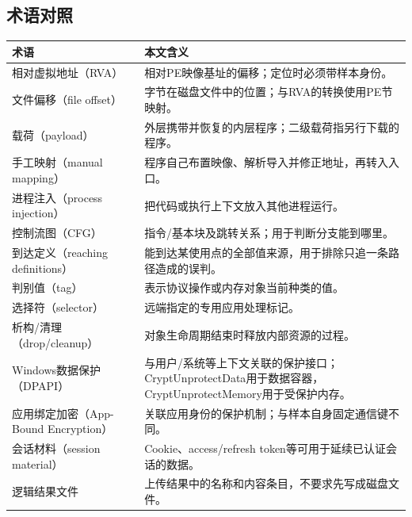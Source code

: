 \documentclass[UTF8,a4paper,zihao=5,fontset=windows]{ctexart}
\newcommand{\code}[1]{{\ttfamily\small #1}}
\begin{document}
\subsection{术语对照}
\begin{longtable}{@{}L{43mm}L{107mm}@{}}\toprule 术语 & 本文含义\\\midrule\endhead
相对虚拟地址（RVA） & 相对PE映像基址的偏移；定位时必须带样本身份。\\
文件偏移（file offset） & 字节在磁盘文件中的位置；与RVA的转换使用PE节映射。\\
载荷（payload） & 外层携带并恢复的内层程序；二级载荷指另行下载的程序。\\
手工映射（manual mapping） & 程序自己布置映像、解析导入并修正地址，再转入入口。\\
进程注入（process injection） & 把代码或执行上下文放入其他进程运行。\\
控制流图（CFG） & 指令/基本块及跳转关系；用于判断分支能到哪里。\\
到达定义（reaching definitions） & 能到达某使用点的全部值来源，用于排除只追一条路径造成的误判。\\
判别值（tag） & 表示协议操作或内存对象当前种类的值。\\
选择符（selector） & 远端指定的专用应用处理标记。\\
析构/清理（drop/cleanup） & 对象生命周期结束时释放内部资源的过程。\\
Windows数据保护（DPAPI） & 与用户/系统等上下文关联的保护接口；\code{CryptUnprotectData}用于数据容器，\code{CryptUnprotectMemory}用于受保护内存。\\
应用绑定加密（App-Bound Encryption） & 关联应用身份的保护机制；与样本自身固定通信键不同。\\
会话材料（session material） & Cookie、access/refresh token等可用于延续已认证会话的数据。\\
逻辑结果文件 & 上传结果中的名称和内容条目，不要求先写成磁盘文件。\\\bottomrule\end{longtable}
\end{document}
